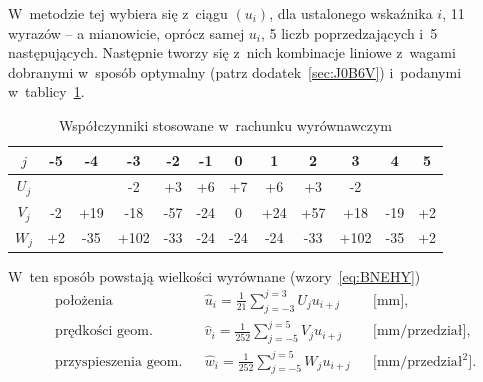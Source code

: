 \documentclass[paper=a4,DIV=12]{tmmlab}
\begin{document}
W~metodzie tej wybiera się z~ciągu $\left(u_i\right)$, dla ustalonego wskaźnika
$i$, 11 wyrazów -- a mianowicie, oprócz samej $u_i$, 5 liczb poprzedzających
i~5 następujących. Następnie tworzy się z~nich kombinacje liniowe z~wagami
dobranymi w~sposób optymalny (patrz dodatek~\ref{sec:J0B6V}) i~podanymi
w~tablicy~\ref{tab:6MI34}.
\begin{table}[htbp]
  \caption{Współczynniki stosowane w~rachunku wyrównawczym}
  \label{tab:6MI34}
  \centering
  \begin{tabular}{|c|c|c|c|c|c|c|c|c|c|c|c|}
    \hline
   $j$  & -5 & -4 & -3 & -2 & -1 &  0 &  1 &  2 &  3 &  4 & 5  \\\hline\hline
   $U_j$&    &    & -2 & +3 & +6 & +7 & +6 & +3 & -2 &    &    \\\hline
   $V_j$& -2 &+19 &-18 &-57 &-24 &  0 &+24 &+57 &+18 &-19 & +2 \\\hline
   $W_j$& +2 &-35 &+102&-33 &-24 &-24 &-24 &-33 &+102&-35 & +2 \\\hline
  \end{tabular}
\end{table}
W~ten sposób powstają wielkości wyrównane (wzory~\eqref{eq:BNEHY})
\begin{subequations}
  \label{eq:BNEHY}
  \begin{align}
    & \text{położenia} & & \hat{u}_i
        = \frac{1}{21} \sum_{j=-3}^{j=3} U_j u_{i+j} & & \text{[mm]},
    \label{eq:HOKXV}
    \\
    & \text{prędkości geom.} & & \hat{v}_i
        = \frac{1}{252} \sum_{j=-5}^{j=5} V_j u_{i+j} & & \text{[mm/przedział]},
    \label{eq:BQ71Z}
    \\
    & \text{przyspieszenia geom.} & & \hat{w}_i
        = \frac{1}{252} \sum_{j=-5}^{j=5} W_j u_{i+j} & & \text{[mm/przedział$^2$]}.
    \label{eq:7IT8Z}
  \end{align}
\end{subequations}
\end{document}
